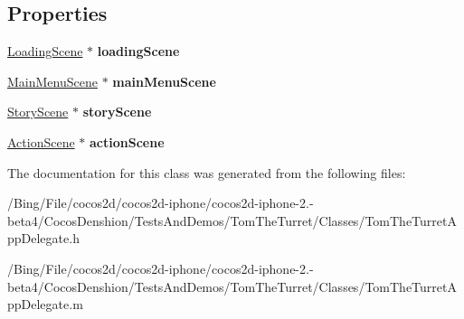 \subsection*{Properties}
\begin{DoxyCompactItemize}
\item 
\hypertarget{interface_tom_the_turret_app_delegate_ab5e38f76d4bee986f0985ac7691f209d}{\hyperlink{interface_loading_scene}{Loading\-Scene} $\ast$ {\bfseries loading\-Scene}}\label{interface_tom_the_turret_app_delegate_ab5e38f76d4bee986f0985ac7691f209d}

\item 
\hypertarget{interface_tom_the_turret_app_delegate_a1055599d4975289261e3f3d2b66ab167}{\hyperlink{interface_main_menu_scene}{Main\-Menu\-Scene} $\ast$ {\bfseries main\-Menu\-Scene}}\label{interface_tom_the_turret_app_delegate_a1055599d4975289261e3f3d2b66ab167}

\item 
\hypertarget{interface_tom_the_turret_app_delegate_a3e3885b75714b080da27beb2ceeec4f5}{\hyperlink{interface_story_scene}{Story\-Scene} $\ast$ {\bfseries story\-Scene}}\label{interface_tom_the_turret_app_delegate_a3e3885b75714b080da27beb2ceeec4f5}

\item 
\hypertarget{interface_tom_the_turret_app_delegate_a7c37e590aa5dd27c59c4d44a75b38017}{\hyperlink{interface_action_scene}{Action\-Scene} $\ast$ {\bfseries action\-Scene}}\label{interface_tom_the_turret_app_delegate_a7c37e590aa5dd27c59c4d44a75b38017}

\end{DoxyCompactItemize}


The documentation for this class was generated from the following files\-:\begin{DoxyCompactItemize}
\item 
/\-Bing/\-File/cocos2d/cocos2d-\/iphone/cocos2d-\/iphone-\/2.-\/beta4/\-Cocos\-Denshion/\-Tests\-And\-Demos/\-Tom\-The\-Turret/\-Classes/Tom\-The\-Turret\-App\-Delegate.\-h\item 
/\-Bing/\-File/cocos2d/cocos2d-\/iphone/cocos2d-\/iphone-\/2.-\/beta4/\-Cocos\-Denshion/\-Tests\-And\-Demos/\-Tom\-The\-Turret/\-Classes/Tom\-The\-Turret\-App\-Delegate.\-m\end{DoxyCompactItemize}
